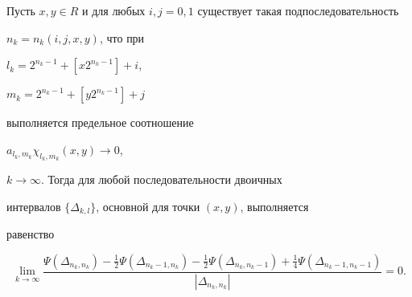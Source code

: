 \begin{assrt}


Пусть $x,y \in R$ и для любых $i,j=0,1$ существует такая подпоследовательность 


$n_k=n_{k}(i,j,x,y)$, что при 


$l_k=2^{n_k-1}+[x2^{n_k-1}]+i$, 


$m_k=2^{n_k-1}+[y2^{n_k-1}]+j$ 


выполняется предельное соотношение


$a_{l_{k},m_{k}}\chi_{l_{k},m_{k}}(x,y) \to 0$, 


$k \to \infty$. Тогда для любой последовательности двоичных 


интервалов $\{\Delta_{k,l}\}$, основной для точки $(x,y)$, выполняется 


равенство


\begin{equation}


\lim\limits_{k \to \infty}\displaystyle\frac


{\Psi(\Delta_{n_k,n_k})-\frac{1}{2}\Psi(\Delta_{n_k-1,n_k})


-\frac{1}{2}\Psi(\Delta_{n_k,n_k-1})


+\frac{1}{4}\Psi(\Delta_{n_k-1,n_k-1})}


{|\Delta_{n_k,n_k}|}=0.


\end{equation}


\end{assrt}





